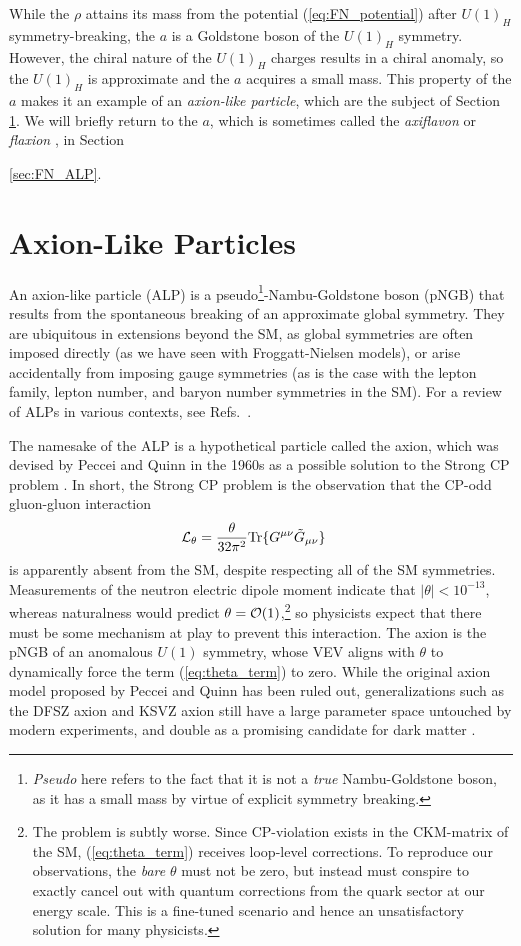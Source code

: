 While the $\rho$ attains its mass from the potential (\ref{eq:FN_potential}) after $U(1)_H$ symmetry-breaking, the $a$ is a Goldstone boson of the $U(1)_H$ symmetry. However, the chiral nature of the $U(1)_H$ charges results in a chiral anomaly, so the $U(1)_H$ is approximate and the $a$ acquires a small mass. This property of the $a$ makes it an example of an {\it axion-like particle}, which are the subject of Section {\ref{sec:ALP}}. We will briefly return to the $a$, which is sometimes called the {\it axiflavon} \cite{Calibbi:2016hwq} or {\it flaxion} \cite{Ema:2016ops}, in Section {\ref{sec:FN_ALP}.

\section{Axion-Like Particles}\label{sec:ALP}
An axion-like particle (ALP) is a pseudo\footnote{{\it Pseudo} here refers to the fact that it is not a {\it true} Nambu-Goldstone boson, as it has a small mass by virtue of explicit symmetry breaking.}-Nambu-Goldstone boson (pNGB) that results from the spontaneous breaking of an approximate global symmetry. They are ubiquitous in extensions beyond the SM, as global symmetries are often imposed directly (as we have seen with Froggatt-Nielsen models), or arise accidentally from imposing gauge symmetries (as is the case with the lepton family, lepton number, and baryon number symmetries in the SM). For a review of ALPs in various contexts, see Refs.~\cite{Ringwald:2014vqa,Choi:2020rgn}.


The namesake of the ALP is a hypothetical particle called the axion, which was devised by Peccei and Quinn in the 1960s as a possible solution to the Strong CP problem \cite{Peccei:1977hh,Peccei:1977ur}. In short, the Strong CP problem is the observation that the CP-odd gluon-gluon interaction
\begin{align}
    {\cal L}_{\theta} &= \frac{\theta}{32\pi^2}{\rm Tr}\{G^{\mu\nu}\tilde{G}_{\mu\nu}\}\label{eq:theta_term}
\end{align}
is apparently absent from the SM, despite respecting all of the SM symmetries. Measurements of the neutron electric dipole moment indicate that $|\theta| < 10^{-13}$, whereas naturalness would predict $\theta = {\cal O}(1)$,\footnote{The problem is subtly worse. Since CP-violation exists in the CKM-matrix of the SM, (\ref{eq:theta_term}) receives loop-level corrections. To reproduce our observations, the {\it bare} $\theta$ must not be zero, but instead must conspire to exactly cancel out with quantum corrections from the quark sector at our energy scale. This is a fine-tuned scenario and hence an unsatisfactory solution for many physicists.} so physicists expect that there must be some mechanism at play to prevent this interaction. The axion is the pNGB of an anomalous $U(1)$ symmetry, whose VEV aligns with $\theta$ to dynamically force the term (\ref{eq:theta_term}) to zero. While the original axion model proposed by Peccei and Quinn has been ruled out, generalizations such as the DFSZ axion \cite{Dine:1981rt,Zhitnitsky:1980tq} and KSVZ axion \cite{Kim:1979if,Shifman:1979if}  still have a large parameter space untouched by modern experiments, and double as a promising candidate for dark matter \cite{Adams:2022pbo}. 

}
